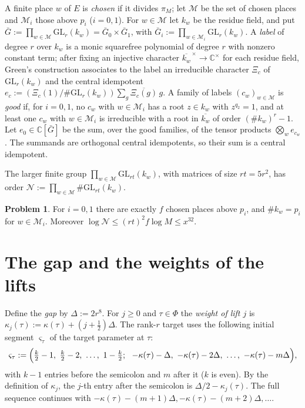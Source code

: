 \documentclass[reqno]{amsart}
\theoremstyle{plain}
\theoremstyle{definition}
\newtheorem{problem}{Problem}[section]
\newcommand{\C}{{\mathbb{C}}}
\begin{document}
A finite place \(w\) of \(E\) is \emph{chosen} if it divides \(\pi_M\); let \(\mathcal M\) be the set of chosen places and \(\mathcal M_i\) those above \(p_i\) (\(i = 0, 1\)).  For \(w \in \mathcal M\) let \(k_w\) be the residue field, and put \(\bar G := \prod_{w \in \mathcal M} \mathrm{GL}_r(k_w) = \bar G_0 \times \bar G_1\), with \(\bar G_i := \prod_{w \in \mathcal M_i} \mathrm{GL}_r(k_w)\).  A \emph{label} of degree \(r\) over \(k_w\) is a monic squarefree polynomial of degree \(r\) with nonzero constant term; after fixing an injective character \(\overline{k_w}^{\,\times}\to\C^\times\) for each residue field, Green's construction associates to the label an irreducible character \(\Xi_c\) of \(\mathrm{GL}_r(k_w)\) and the central idempotent \(e_c := (\Xi_c(1)/\#\mathrm{GL}_r(k_w)) \sum_g \overline{\Xi_c(g)}\, g\).  A family of labels \((c_w)_{w \in \mathcal M}\) is \emph{good} if, for \(i = 0, 1\), no \(c_w\) with \(w \in \mathcal M_i\) has a root \(z \in k_w\) with \(z^{q_2} = 1\), and at least one \(c_w\) with \(w \in \mathcal M_i\) is irreducible with a root in \(\overline{k_w}\) of order \((\#k_w)^r - 1\).  Let \(e_0 \in \C[\bar G]\) be the sum, over the good families, of the tensor products \(\bigotimes_w e_{c_w}\).  The summands are orthogonal central idempotents, so their sum is a central idempotent.

The larger finite group \(\prod_{w \in \mathcal M} \mathrm{GL}_{rt}(k_w)\), with matrices of size \(rt = 5r^2\), has order \(\mathcal N := \prod_{w \in \mathcal M} \#\mathrm{GL}_{rt}(k_w)\).

\begin{problem}\label{pr:group-order}
For \(i = 0, 1\) there are exactly \(f\) chosen places above \(p_i\), and \(\#k_w = p_i\) for \(w \in \mathcal M_i\).  Moreover \(\log \mathcal N \le (rt)^2 f \log M \le x^{32}\).
\end{problem}

\section{The gap and the weights of the lifts}\label{sec:weights}

Define the \emph{gap} by \(\Delta := 2r^8\).  For \(j \ge 0\) and \(\tau \in \Phi\) the \emph{weight of lift \(j\)} is \(\kappa_j(\tau) := \kappa(\tau) + (j + \frac12)\Delta\).  The rank-\(r\) target uses the following initial segment \(\varsigma_\tau\) of the target parameter at \(\tau\):
\[
  \varsigma_\tau := \Bigl(\tfrac k2 - 1,\ \tfrac k2 - 2,\ \dots,\ 1 - \tfrac k2;\ \ -\kappa(\tau) - \Delta,\ -\kappa(\tau) - 2\Delta,\ \dots,\ -\kappa(\tau) - m\Delta\Bigr) ,
\]
with \(k - 1\) entries before the semicolon and \(m\) after it (\(k\) is even).  By the definition of \(\kappa_j\), the \(j\)-th entry after the semicolon is \(\Delta/2 - \kappa_j(\tau)\).  The full sequence continues with \(-\kappa(\tau)-(m+1)\Delta,-\kappa(\tau)-(m+2)\Delta,\dots\).
\end{document}
